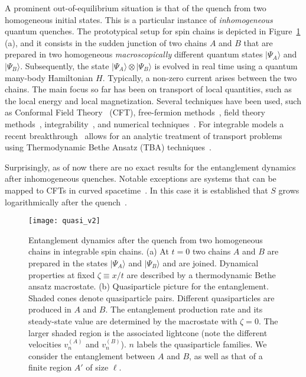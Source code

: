 \documentclass[twocolumn,superscriptaddress,prb,10pt]{revtex4-1}
\begin{document}
A prominent out-of-equilibrium situation is that of the quench from two 
homogeneous initial states. This is a particular instance of 
{\it inhomogeneous} quantum quenches. The prototypical setup for spin chains is depicted in 
Figure~\ref{fig0} (a), and it consists in the sudden junction of two chains 
$A$ and $B$ that are prepared in two homogeneous {\it macroscopically} different  
quantum states $|\Psi_A\rangle$ and $|\Psi_B\rangle$. 
Subsequently, 
the state $|\Psi_A\rangle\otimes|\Psi_B\rangle$ is evolved in real time 
using a quantum many-body Hamiltonian $H$. Typically, a non-zero current 
arises between the two chains. The main focus so far has 
been on transport of local quantities, such as the local energy and 
local magnetization. Several techniques have been used, such as Conformal Field 
Theory~\cite{spyros-2008,bernard-2012,bhaseen-2015,allegra-2016,dubail-2017,dubail-2017a} (CFT), 
free-fermion methods~\cite{eisler-2009,de-luca-2013,sabetta-2013,eisler-2013,alba-2014,collura-2014,de-luca-2016,
eisler-2016,viti-2016,kormos-2017,perfetto-2017,vidmar-2017}, field theory methods~\cite{de-luca-2014,olalla-2014,biella-2016}, 
integrability~\cite{zotos-1997,zotos-1999,prosen-2011,prosen-2013,ilievski-2015}, and 
numerical techniques~\cite{fabian-2003,gobert-2005,langer-2009,karrasch-2012,karrasch-2013,vidmar-2017}. For integrable models 
a recent breakthrough~\cite{olalla-2016,bertini-2016} allows for an analytic treatment of transport 
problems using Thermodynamic Bethe Ansatz (TBA) techniques~\cite{doyon-2016,yoshimura-2016,de-luca-2016a,
doyon-2017,doyon-2017a,doyon-2017b,doyon-2017c,bulchandani-2017,bulchandani-2017a,ilievski-2017,doyon-2017d}. 

Surprisingly, as of now there are no exact results for the entanglement dynamics after inhomogeneous quenches. 
Notable exceptions are systems that can be 
mapped to CFTs in curved spacetime~\cite{allegra-2016,dubail-2017,dubail-2017a}. In 
this case it is established that $S$ grows logarithmically after the quench~\cite{dubail-2017}. 
%
\begin{figure}[t]
\texttt{[image: quasi\_v2]}
\caption{ Entanglement dynamics after the quench from two homogeneous 
 chains  in integrable spin chains. (a) At $t=0$ two chains $A$ and 
 $B$ are prepared in the states $|\Psi_A\rangle$ and 
 $|\Psi_B\rangle$ and are joined. Dynamical 
 properties  at fixed $\zeta\equiv x/t$ are described by 
 a thermodynamic Bethe ansatz macrostate. (b) Quasiparticle picture for the 
 entanglement. Shaded cones denote quasiparticle 
 pairs. Different quasiparticles are produced in $A$ and $B$. 
 The entanglement production rate and its steady-state value are 
 determined by the macrostate with $\zeta=0$. The larger shaded region is 
 the associated lightcone (note the different velocities $v_n^{
 \scriptscriptstyle(A)}$ and $v_n^{\scriptscriptstyle(B)}$). 
 $n$ labels the quasiparticle families. We consider the 
 entanglement between $A$ and $B$, as well as that of a 
 finite region $A'$ of size $\ell$. 
}
\label{fig0}
\end{figure}
%
\end{document}
